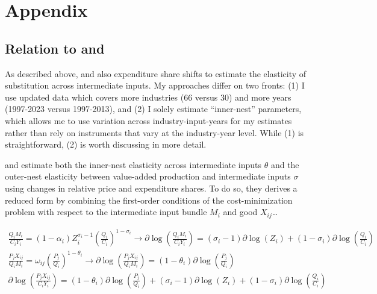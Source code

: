 \documentclass[11pt]{article}
\begin{document}
\pagebreak 

\appendix
\renewcommand{\thefigure}{A.\arabic{figure}}
\setcounter{figure}{0}
\renewcommand{\thetable}{A.\arabic{table}}
\setcounter{table}{0}

\section{Appendix}

\subsection{Relation to \citet{atalayHowImportantAre2017} and \citet{miranda-pintoFlexibilityFrictionsMultisector2022}}
\label{ap:atalay}

As described above, \citet{atalayHowImportantAre2017} and \citet{miranda-pintoFlexibilityFrictionsMultisector2022} also expenditure share shifts to estimate the elasticity of substitution across intermediate inputs. My approaches differ on two fronts: (1) I use updated data which covers more industries (66 versus 30) and more years (1997-2023 versus 1997-2013), and (2) I solely estimate ``inner-nest'' parameters, which allows me to use variation across industry-input-years for my estimates rather than rely on instruments that vary at the industry-year level. While (1) is straightforward, (2) is worth discussing in more detail.

\citet{atalayHowImportantAre2017} and \citet{miranda-pintoFlexibilityFrictionsMultisector2022} estimate both the inner-nest elasticity across intermediate inputs $\theta$ and the outer-nest elasticity between value-added production and intermediate inputs $\sigma$ using changes in relative price and expenditure shares. To do so, they derives a reduced form by combining the first-order conditions of the cost-minimization problem with respect to the intermediate input bundle $M_i$ and good $X_{ij}$\dots

\[
\begin{aligned}
\frac{Q_i M_i}{C_i Y_i} = (1-\alpha_i) Z_i^{\sigma_i - 1} \left(\frac{Q_i}{C_i}\right)^{1 - \sigma_i} \rightarrow \partial \log \left(\frac{Q_i M_i}{C_i Y_i}\right) = (\sigma_i - 1) \partial \log(Z_i) + (1 - \sigma_i) \partial \log \left(\frac{Q_i}{C_i}\right) \\
\frac{P_j X_{ij}}{Q_i M_i} = \omega_{ij} \left(\frac{P_j}{Q_i}\right)^{1 - \theta_i} \rightarrow \partial \log \left(\frac{P_j X_{ij}}{Q_i M_i}\right) = (1 - \theta_i) \partial \log \left(\frac{P_j}{Q_i}\right) \\
\partial \log \left(\frac{P_j X_{ij}}{C_i Y_i}\right) = (1 - \theta_i) \partial \log \left(\frac{P_j}{Q_i}\right) + (\sigma_i - 1) \partial \log(Z_i) + (1 - \sigma_i) \partial \log \left(\frac{Q_i}{C_i}\right)
\end{aligned}
\]
\end{document}
